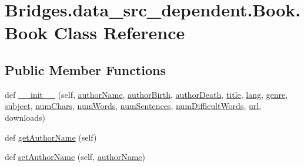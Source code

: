 \hypertarget{class_bridges_1_1data__src__dependent_1_1_book_1_1_book}{}\section{Bridges.\+data\+\_\+src\+\_\+dependent.\+Book.\+Book Class Reference}
\label{class_bridges_1_1data__src__dependent_1_1_book_1_1_book}
\subsection*{Public Member Functions}
\begin{DoxyCompactItemize}
\item 
def \hyperlink{class_bridges_1_1data__src__dependent_1_1_book_1_1_book_a127f7f68e8148d12c38d6889aef6009c}{\+\_\+\+\_\+init\+\_\+\+\_\+} (self, \hyperlink{class_bridges_1_1data__src__dependent_1_1_book_1_1_book_ab3cf8a384cb31bfbf2cd020f312023cb}{author\+Name}, \hyperlink{class_bridges_1_1data__src__dependent_1_1_book_1_1_book_aa174f40c45436eacd54cdad46da105cc}{author\+Birth}, \hyperlink{class_bridges_1_1data__src__dependent_1_1_book_1_1_book_a7c4da54fa7bc168bc24ad98524fbbbf7}{author\+Death}, \hyperlink{class_bridges_1_1data__src__dependent_1_1_book_1_1_book_a83b8679cabf2db52dbcd57c1f0264f32}{title}, \hyperlink{class_bridges_1_1data__src__dependent_1_1_book_1_1_book_af5bdad8efb534ad626713edf238bf389}{lang}, \hyperlink{class_bridges_1_1data__src__dependent_1_1_book_1_1_book_a7ac02f70ccb2335eac8d78c437e7a04f}{genre}, \hyperlink{class_bridges_1_1data__src__dependent_1_1_book_1_1_book_a5e4d7efd63c17423383ea755d1e05543}{subject}, \hyperlink{class_bridges_1_1data__src__dependent_1_1_book_1_1_book_aca265f2a5dd95bca41455b6502364a8d}{num\+Chars}, \hyperlink{class_bridges_1_1data__src__dependent_1_1_book_1_1_book_a0db2ddd13ff6460d0a746f14dd0b09c0}{num\+Words}, \hyperlink{class_bridges_1_1data__src__dependent_1_1_book_1_1_book_a4369c7a7fa2abdaff7905bac8dea1c78}{num\+Sentences}, \hyperlink{class_bridges_1_1data__src__dependent_1_1_book_1_1_book_a1b9c36a1c840d703e24e033e8ad2ea4c}{num\+Difficult\+Words}, \hyperlink{class_bridges_1_1data__src__dependent_1_1_book_1_1_book_a4e2f9719a091a7bd9487a3beafb8ad79}{url}, downloads)
\item 
def \hyperlink{class_bridges_1_1data__src__dependent_1_1_book_1_1_book_abecb2c00513e7684624c298e3539cf8c}{get\+Author\+Name} (self)
\item 
def \hyperlink{class_bridges_1_1data__src__dependent_1_1_book_1_1_book_aef5f743272cc4c861fc738885d338c37}{set\+Author\+Name} (self, \hyperlink{class_bridges_1_1data__src__dependent_1_1_book_1_1_book_ab3cf8a384cb31bfbf2cd020f312023cb}{author\+Name})

\end{DoxyCompactItemize}
